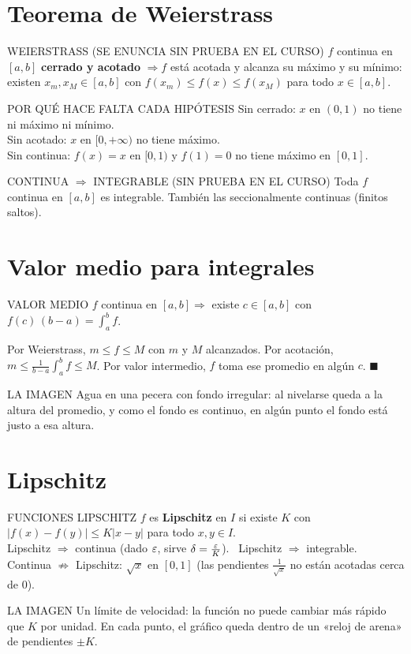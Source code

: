 \section{Teorema de Weierstrass}
\agregado
\begin{sello}{WEIERSTRASS (SE ENUNCIA SIN PRUEBA EN EL CURSO)}
$f$ continua en $[a,b]$ \textbf{cerrado y acotado} $\Rightarrow f$ está acotada y alcanza su máximo y su mínimo: existen $x_m,x_M\in[a,b]$ con $f(x_m)\le f(x)\le f(x_M)$ para todo $x\in[a,b]$.
\end{sello}
\begin{memo}{POR QUÉ HACE FALTA CADA HIPÓTESIS}
Sin cerrado: $x$ en $(0,1)$ no tiene ni máximo ni mínimo.\\
Sin acotado: $x$ en $[0,+\infty)$ no tiene máximo.\\
Sin continua: $f(x)=x$ en $[0,1)$ y $f(1)=0$ no tiene máximo en $[0,1]$.
\end{memo}
\agregado
\begin{sello}{CONTINUA $\Rightarrow$ INTEGRABLE (SIN PRUEBA EN EL CURSO)}
Toda $f$ continua en $[a,b]$ es integrable. También las seccionalmente continuas (finitos saltos).
\end{sello}

\section{Valor medio para integrales}
\agregado
\begin{sello}{VALOR MEDIO}
$f$ continua en $[a,b]\Rightarrow$ existe $c\in[a,b]$ con $f(c)\,(b-a)=\int_a^bf$.
\end{sello}
\begin{demo}
Por Weierstrass, $m\le f\le M$ con $m$ y $M$ alcanzados. Por acotación, $m\le\frac1{b-a}\int_a^bf\le M$. Por valor intermedio, $f$ toma ese promedio en algún $c$. $\blacksquare$
\end{demo}
\begin{tip}{LA IMAGEN}
Agua en una pecera con fondo irregular: al nivelarse queda a la altura del promedio, y como el fondo es continuo, en algún punto el fondo está justo a esa altura.
\end{tip}

\section{Lipschitz}
\agregado
\begin{sello}{FUNCIONES LIPSCHITZ}
$f$ es \textbf{Lipschitz} en $I$ si existe $K$ con $|f(x)-f(y)|\le K|x-y|$ para todo $x,y\in I$.\\[3pt]
Lipschitz $\Rightarrow$ continua (dado $\varepsilon$, sirve $\delta=\frac{\varepsilon} K$). \ Lipschitz $\Rightarrow$ integrable.\\[2pt]
Continua $\not\Rightarrow$ Lipschitz: $\sqrt x$ en $[0,1]$ (las pendientes $\frac1{\sqrt x}$ no están acotadas cerca de 0).
\end{sello}
\begin{tip}{LA IMAGEN}
Un límite de velocidad: la función no puede cambiar más rápido que $K$ por unidad. En cada punto, el gráfico queda dentro de un «reloj de arena» de pendientes $\pm K$.
\end{tip}
